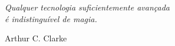 \begin{agradecimentos}






\end{agradecimentos}

\begin{epigrafe}
    \vspace*{\fill}
	\begin{flushright}
		\textit{Qualquer tecnologia suficientemente avançada \\
		é indistinguível de magia.}
        
        Arthur C. Clarke
	\end{flushright}
\end{epigrafe}
